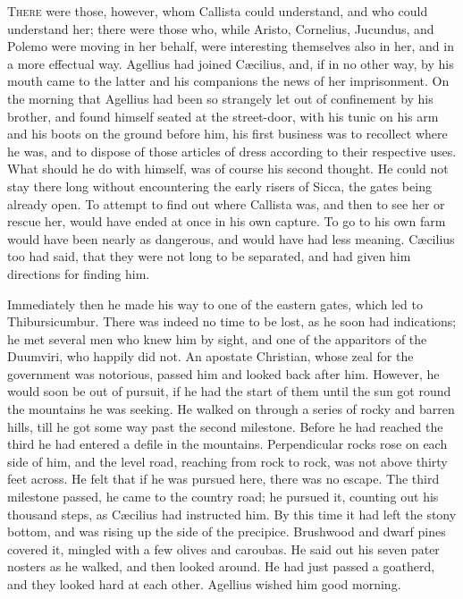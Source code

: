 T\textsc{here} were those, however, whom Callista could understand,
and who could understand her; there were those who, while Aristo,
Cornelius, Jucundus, and Polemo were moving in her behalf, were
interesting themselves also in her, and in a more effectual way.
Agellius had joined Cæcilius, and, if in no other way, by his mouth
came to the latter and his companions the news of her imprisonment. On
the morning that Agellius had been so strangely let out of confinement
by his brother, and found himself seated at the street-door, with his
tunic on his arm and his boots on the ground before him, his first
business was to recollect where he was, and to dispose of those
articles of dress according to their respective uses. What should he
do with himself, was of course his second thought. He could not stay
there long without encountering the early risers of Sicca, the gates
being already open. To attempt to find out where Callista was, and
then to see her or rescue her, would have ended at once in his own
capture. To go to his own farm would have been nearly as dangerous,
and would have had less meaning. Cæcilius too had said, that
they were not long to be separated, and had given him directions for
finding him.

Immediately then he made his way to one of the eastern gates, which
led to Thibursicumbur. There was indeed no time to be lost, as he soon
had indications; he met several men who knew him by sight, and one of
the apparitors of the Duumviri, who happily did not. An apostate
Christian, whose zeal for the government was notorious, passed him and
looked back after him. However, he would soon be out of pursuit, if he
had the start of them until the sun got round the mountains he was
seeking. He walked on through a series of rocky and barren hills, till
he got some way past the second milestone. Before he had reached the
third he had entered a defile in the mountains. Perpendicular rocks
rose on each side of him, and the level road, reaching from rock to
rock, was not above thirty feet across. He felt that if he was pursued
here, there was no escape. The third milestone passed, he came to the
country road; he pursued it, counting out his thousand steps, as
Cæcilius had instructed him. By this time it had left the stony
bottom, and was rising up the side of the precipice. Brushwood and
dwarf pines covered it, mingled with a few olives and caroubas. He
said out his seven pater nosters as he walked, and then looked around.
He had just passed a goatherd, and they looked hard at each other.
Agellius wished him good morning.

